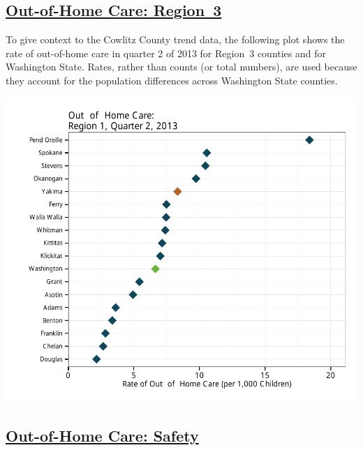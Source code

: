 \documentclass{article}\usepackage[]{graphicx}\usepackage[]{color}
\makeatletter
\def\maxwidth{ %
  \ifdim\Gin@nat@width>\linewidth
    \linewidth
  \else
    \Gin@nat@width
  \fi
}
\newenvironment{knitrout}{}{} %
\makeatother
\begin{document}
\begin{minipage}{\textwidth}
\subsection{\href{http://www.partnersforourchildren.org/child-well-being/visualizations/out-home-care/trends}
    {Out-of-Home Care: Region~3}
}
To give context to the Cowlitz County trend data, the following plot shows the rate of out-of-home care in quarter 2 of 2013 for Region~3 counties and for Washington State. Rates, rather than counts (or total numbers), are used because they account for the population differences across Washington State counties.\\[1pt]
\begin{knitrout}
\color{fgcolor}

{\centering \includegraphics[width=\maxwidth]{figure/ooh_context} 

}



\end{knitrout}

\end{minipage}
\newpage

\subsection{\href{http://www.partnersforourchildren.org/child-well-being/visualizations/out-home-care/safety}
    {Out-of-Home Care: Safety}
}
\end{document}
